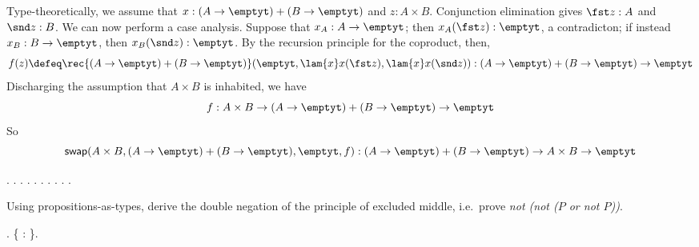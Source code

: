 Type-theoretically, we assume that $x : (A \to\emptyt) + (B \to\emptyt)$ and $z
: A \times B$.  Conjunction elimination gives $\fst z : A$ and $\snd z : B$.
We can now perform a case analysis.  Suppose that $x_{A} : A \to \emptyt$; then
$x_{A}(\fst z) : \emptyt$, a contradicton; if instead $x_{B} : B \to \emptyt$,
then $x_{B}(\snd z) : \emptyt$.  By the recursion principle for the coproduct,
then,
\[
f(z) \defeq \rec{(A\to\emptyt)+(B\to\emptyt)}(
\emptyt,
\lam{x}x(\fst z),
\lam{x}x(\snd z)
)
:
(A \to \emptyt) + (B \to \emptyt) \to \emptyt
\]
Discharging the assumption that $A \times B$ is inhabited, we have
\[
f : 
A \times B \to (A \to \emptyt) + (B \to \emptyt) \to \emptyt
\]
So
\[
\mathsf{swap}(A\times B, (A\to\emptyt)+(B\to\emptyt), \emptyt, f)
:
(A \to \emptyt) + (B \to \emptyt) 
\to 
A \times B 
\to \emptyt
\] \begin{coqdoccode}
\coqdocindent{1.00em}
 \coqdocnotation{\ensuremath{\lnot}}   \coqdocnotation{\ensuremath{\lnot}}   \coqdocnotation{\ensuremath{\lnot}} \coqdocnotation{(}  \coqdocnotation{)}.\coqdoceol
\coqdocindent{1.00em}
.\coqdoceol
\coqdocindent{2.00em}
 .\coqdoceol
\coqdocindent{2.00em}
  .\coqdoceol
\coqdocindent{2.00em}
 .\coqdoceol
\coqdocindent{2.00em}
 .\coqdoceol
\coqdocindent{2.00em}
.\coqdoceol
\coqdocindent{2.00em}
 .\coqdoceol
\coqdocindent{1.00em}
.\coqdoceol
\coqdocemptyline
\coqdocnoindent
{} .\coqdoceol
\coqdocemptyline
\end{coqdoccode}
Using propositions-as-types, derive the double negation of the
principle of excluded middle, i.e.~prove 
\emph{not (not ($P$ or not $P$))}. \begin{coqdoccode}
\coqdocemptyline
\coqdocnoindent
{} .\coqdoceol
\coqdocindent{1.00em}
 \{ : \}.\coqdoceol
\coqdocemptyline
\end{coqdoccode}


